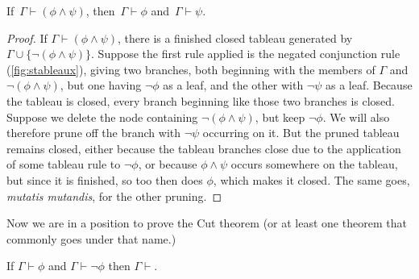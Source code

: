 \begin{lemma} \label{con}
	If\, $\Gamma \vdash (\phi\wedge\psi)$, then\, $\Gamma \vdash \phi$ and\, $\Gamma \vdash \psi$.
\end{lemma}
\begin{proof}
	If $\Gamma \vdash (\phi\wedge\psi)$, there is a finished closed tableau generated by $\Gamma \cup\{\neg(\phi\wedge\psi)\}$. Suppose the first rule applied is the negated conjunction rule (\autoref{fig:stableaux}), giving two branches, both beginning with the members of $\Gamma$ and $\neg(\phi\wedge\psi)$, but one having $\neg\phi$ as a leaf, and the other with $\neg\psi$ as a leaf. Because the tableau is closed, every branch beginning like those two branches is closed. Suppose we delete the node containing $\neg(\phi\wedge\psi)$, but keep $\neg\phi$. We will also therefore prune off the branch with $\neg\psi$ occurring on it. But the pruned tableau remains closed, either because the tableau branches close due to the application of some tableau rule to $\neg\phi$, or because $\phi\wedge\psi$ occurs somewhere on the tableau, but since it is finished, so too then does $\phi$, which makes it closed. The same goes, \emph{mutatis mutandis}, for the other pruning.
\end{proof} 
Now we are in a position to prove the Cut theorem (or at least one theorem that commonly goes under that name.)
\begin{theorem}[Cut] \label{cut}
	If $\Gamma \vdash \phi$ and $\Gamma \vdash \neg\phi$ then $\Gamma \vdash$.
\end{theorem}
